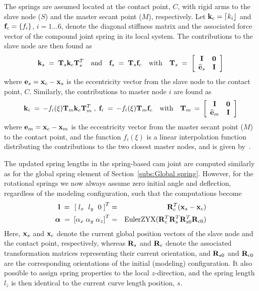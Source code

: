 The springs are assumed located at the contact point, $C$, with rigid arms to
the slave node ($S$) and the master secant point ($M$), respectively.
Let ${\bf k}_c = \lceil k_i \rfloor$ and ${\bf f}_c = \{ f_i \}$, $i=1\ldots6$,
denote the diagonal stiffness matrix and the associated force vector of the
compound joint spring in its local system.
The contributions to the slave node are then found as
%
\begin{equation}
{\bf k}_s \;=\; {\bf T}_s{\bf k}_c{\bf T}_s^T \quad\text{and}\quad
{\bf f}_s \;=\; {\bf T}_s{\bf f}_c \quad\text{with}\quad
{\bf T}_s \;=\; \left[\begin{array}{cc}
{\bf I} & {\bf 0} \\ \widehat{\bf e}_s & {\bf I} \end{array}\right]
\end{equation}
%
where ${\bf e}_s = {\bf x}_c - {\bf x}_s$ is the eccentricity vector from the
slave node to the contact point, $C$.
Similarly, the contributions to master node $i$ are found as
%
\begin{equation}
{\bf k}_i \;=\, -f_i(\xi){\bf T}_m{\bf k}_c{\bf T}_m^T \;,\;
{\bf f}_i \;=\, -f_i(\xi){\bf T}_m{\bf f}_c \quad\text{with}\quad
{\bf T}_m \,=\, \left[\begin{array}{cc}
{\bf I} & {\bf 0} \\ \widehat{\bf e}_m & {\bf I} \end{array}\right]
\end{equation}
%
where ${\bf e}_m = {\bf x}_c - {\bf x}_m$ is the eccentricity vector from the
master secant point ($M$) to the contact point, and the function $f_i(\xi)$
is a linear interpolation function distributing the contributions to the two
closest master nodes, and is given by~.

The updated spring lengths in the spring-based cam joint are computed similarly
as for the global spring element of Section~\ref{subs:Global spring}.
However, for the rotational springs we now always assume zero initial angle and
deflection, regardless of the modeling configuration,
such that the computations become
%
\begin{eqnarray}
\label{eq:CamSpringLength}
{\bf l} \;=\hskip4pt \left[\; l_x \hskip6pt l_y \hskip6pt 0\;\right]^T &=&
{\bf R}_c^T({\bf x}_s - {\bf x}_c) \\
\label{eq:CamSpringAngle}
{\boldsymbol{\alpha}} \;=\; \left[\alpha_x \; \alpha_y \; \alpha_z\right]^T &=&
{\rm EulerZYX}({\bf R}_c^T{\bf R}_s^T{\bf R}_{s0}^T{\bf R}_{c0})
\end{eqnarray}
%
Here, ${\bf x}_s$ and ${\bf x}_c$ denote the current global position vectors of
the slave node and the contact point, respectively, whereas ${\bf R}_s$ and
${\bf R}_c$ denote the associated transformation matrices representing their
current orientation, and ${\bf R}_{s0}$ and ${\bf R}_{c0}$
are the corresponding orientations of the initial (modeling) configuration.
It also possible to assign spring properties to the local $z$-direction, and the
spring length $l_z$ is then identical to the current curve length position, $s$.

